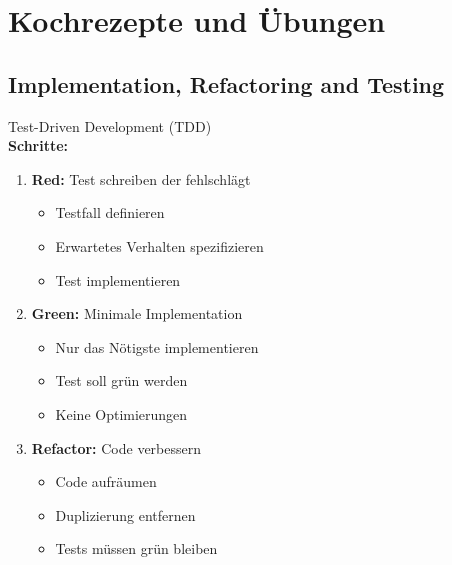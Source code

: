 \section{Kochrezepte und Übungen}

\subsection{Implementation, Refactoring and Testing}

\begin{KR}{Test-Driven Development (TDD)}\\
\textbf{Schritte:}
\begin{enumerate}
    \item \textbf{Red:} Test schreiben der fehlschlägt
    \begin{itemize}
        \item Testfall definieren
        \item Erwartetes Verhalten spezifizieren
        \item Test implementieren
    \end{itemize}
    
    \item \textbf{Green:} Minimale Implementation
    \begin{itemize}
        \item Nur das Nötigste implementieren
        \item Test soll grün werden
        \item Keine Optimierungen
    \end{itemize}
    
    \item \textbf{Refactor:} Code verbessern
    \begin{itemize}
        \item Code aufräumen
        \item Duplizierung entfernen
        \item Tests müssen grün bleiben
    \end{itemize}
\end{enumerate}
\end{KR}

